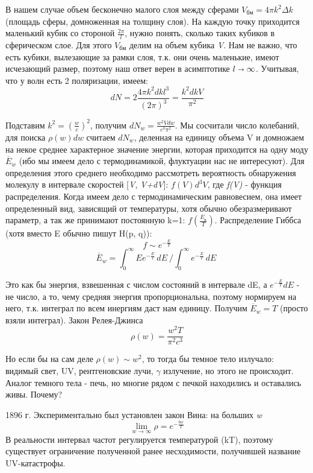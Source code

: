  \par В нашем случае объем бесконечно малого слоя между сферами $V_{бм}=4 \pi k^2 \Delta k$ (площадь сферы, домноженная на толщину слоя). На каждую точку приходится маленький кубик со стороной $\frac{2 \pi}{l}$, нужно понять, сколько таких кубиков в сферическом слое. Для этого $V_{бм}$ делим на объем кубика \textit{V}. Нам не важно, что есть кубики, вылезающие за рамки слоя, т.к. они очень маленькие, имеют исчезающий размер, поэтому наш ответ верен в асимптотике  $l \shortrightarrow \infty$. Учитывая, что у волн есть 2 поляризации, имеем:
$$ dN = 2 \frac{4 \pi k^2 dk l^3}{(2 \pi)^3} =\frac{k^2dk V}{\pi ^2} $$
\par Подставим $k^2=(\frac{w}{c})^2$, получим $ dN_w =  \frac{w^2 V dw}{c^3 \pi^2} $. Мы сосчитали число колебаний, для поиска $\rho (w) dw$ считаем  $ dN_w $, деленная на единицу объема V и домножаем на некое среднее характерное значение энергии, которая приходится на одну моду $ \overline E_w$ (ибо мы имеем дело с термодинамикой, флуктуации нас не интересуют). Для определения этого среднего необходимо рассмотреть вероятность обнаружения молекулу в интервале скоростей [\textit{V}, \textit{V+dV}]: $f(V)d^3V$, где \textit{f(V)} - функция распределения. Когда имеем дело с термодинамическим равновесием, она имеет определенный вид, зависящий от температуры, хотя обычно обезразмеривают параметр, а так же принимают постоянную k=1: $f(\frac{E_к}{T})$. Распределение Гиббса (хотя вместо E обычно пишут H(p, q)):
$$ f \sim e^{-\frac{E}{T}} $$
$$\overline E_w = \int_{0}^{\infty} Ee^{-\frac{E}{T}}\,dE\ / \int_{0}^{\infty}e^{-\frac{E}{T}} \,dE\ $$
\par Это как бы энергия, взвешенная с числом состояний в интервале dE, а $e^{-\frac{E}{T}} dE$ - не число, а то, чему средняя энергия пропорциональна, поэтому нормируем на него, т.к. интеграл по всем инергиям даст нам единицу. Получим $\overline E_w = T$ (просто взяли интеграл). Закон Релея-Джинса
$$ \rho (w) = \frac{w^2 T}{\pi ^2 c^3} $$
\par Но если бы на сам деле $ \rho (w) \sim w^2 $, то тогда бы темное тело излучало: видимый свет, UV, рентгеновские лучи, $ \gamma $ излучение, но этого не происходит. Аналог темного тела - печь, но многие рядом с печкой находились и оставались живы. Почему?
\par 1896 г. Экспериментально был установлен закон Вина: на больших \textit{w} $$ \lim_{w\to\infty} \rho =e^{-\frac{b w}{T}} $$ В реальности интервал частот регулируется температурой (kT), поэтому существует ограничение полученной ранее несходимости, получившей название UV-катастрофы.



